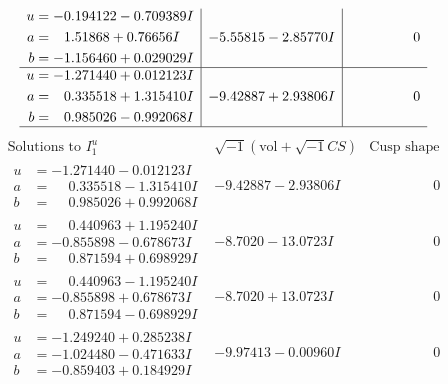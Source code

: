 \documentclass[1p]{elsarticle_modified}
\theoremstyle{definition}
\newcommand{\I}{\sqrt{-1}}
\begin{document}
$$\begin{array}{c|c|c}
\begin{aligned}
u &= -0.194122 - 0.709389 I \\
a &= \phantom{-}1.51868 + 0.76656 I \\
b &= -1.156460 + 0.029029 I\end{aligned}
 & -5.55815 - 2.85770 I & \phantom{-0.000000 } 0 \\ \hline\begin{aligned}
u &= -1.271440 + 0.012123 I \\
a &= \phantom{-}0.335518 + 1.315410 I \\
b &= \phantom{-}0.985026 - 0.992068 I\end{aligned}
 & -9.42887 + 2.93806 I & \phantom{-0.000000 } 0\\
 \hline 
 \end{array}$$\newpage$$\begin{array}{c|c|c}  
\text{Solutions to }I^u_{1}& \I (\text{vol} + \sqrt{-1}CS) & \text{Cusp shape}\\
 \hline 
\begin{aligned}
u &= -1.271440 - 0.012123 I \\
a &= \phantom{-}0.335518 - 1.315410 I \\
b &= \phantom{-}0.985026 + 0.992068 I\end{aligned}
 & -9.42887 - 2.93806 I & \phantom{-0.000000 } 0 \\ \hline\begin{aligned}
u &= \phantom{-}0.440963 + 1.195240 I \\
a &= -0.855898 - 0.678673 I \\
b &= \phantom{-}0.871594 + 0.698929 I\end{aligned}
 & -8.7020 - 13.0723 I & \phantom{-0.000000 } 0 \\ \hline\begin{aligned}
u &= \phantom{-}0.440963 - 1.195240 I \\
a &= -0.855898 + 0.678673 I \\
b &= \phantom{-}0.871594 - 0.698929 I\end{aligned}
 & -8.7020 + 13.0723 I & \phantom{-0.000000 } 0 \\ \hline\begin{aligned}
u &= -1.249240 + 0.285238 I \\
a &= -1.024480 - 0.471633 I \\
b &= -0.859403 + 0.184929 I\end{aligned}
 & -9.97413 - 0.00960 I & \phantom{-0.000000 } 0 \\ \hline\begin{aligned}

\end{aligned}
\end{array}$$
\end{document}
